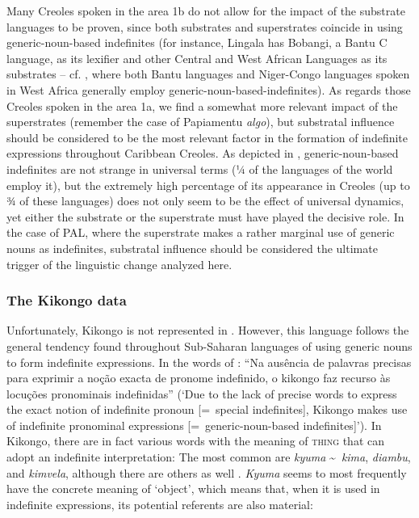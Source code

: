 \documentclass[output=paper,colorlinks,citecolor=brown]{langscibook}
\begin{document}
Many Creoles spoken in the area 1b do not allow for the impact of the substrate languages to be proven, since both substrates and superstrates coincide in using generic-noun-based indefinites (for instance, Lingala has Bobangi, a Bantu C language, as its lexifier and other Central and West African Languages as its substrates -- cf. \cite{Meeuwis2013}, where both Bantu languages and Niger-Congo languages spoken in West Africa generally employ generic-noun-based-indefinites). As regards those Creoles spoken in the area 1a, we find a somewhat more relevant impact of the superstrates (remember the case of Papiamentu \textit{algo}), but substratal influence should be considered to be the most relevant factor in the formation of indefinite expressions throughout Caribbean Creoles. As depicted in , generic-noun-based indefinites are not strange in universal terms (¼ of the languages of the world employ it), but the extremely high percentage of its appearance in Creoles (up to ¾ of these languages) does not only seem to be the effect of universal dynamics, yet either the substrate or the superstrate must have played the decisive role. In the case of PAL, where the superstrate makes a rather marginal use of generic nouns as indefinites, substratal influence should be considered the ultimate trigger of the linguistic change analyzed here.

\subsubsection{The Kikongo data}\label{sec:gut3.3.2}

Unfortunately, Kikongo is not represented in  . However, this language follows the general tendency found throughout Sub-Saharan languages of using generic nouns to form indefinite expressions. In the words of \citet[][118]{Kyala2013}: “Na ausência de palavras precisas para exprimir a noção exacta de pronome indefinido, o kikongo faz recurso às locuções pronominais indefinidas” (‘Due to the lack of precise words to express the exact notion of indefinite pronoun [=~special indefinites], Kikongo makes use of indefinite pronominal expressions [=~generic\hyp noun\hyp based indefinites]’). In Kikongo, there are in fact various words with the meaning of \textsc{thing} that can adopt an indefinite interpretation: The most common are \textit{kyuma} \textasciitilde\ \textit{kima}, \textit{diambu}, and \textit{kimvela}, although there are others as well \citep[cf.][150--151]{Laman1912}. \textit{Kyuma} seems to most frequently have the concrete meaning of ‘object’, which means that, when it is used in indefinite expressions, its potential referents are also material:
\end{document}
